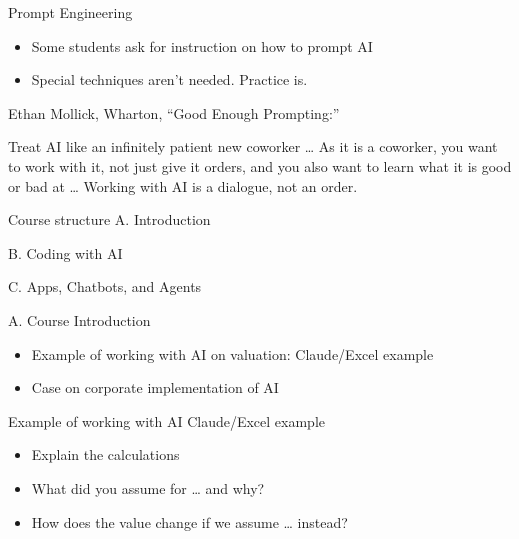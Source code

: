 \documentclass[
  ignorenonframetext,
]{beamer}
\providecommand{\tightlist}{%
  \setlength{\itemsep}{0pt}\setlength{\parskip}{0pt}}
\begin{document}
\begin{frame}{Prompt Engineering}
\label{prompt-engineering}
\begin{itemize}
\tightlist
\item
  Some students ask for instruction on how to prompt AI
\item
  Special techniques aren't needed. Practice is.
\end{itemize}

Ethan Mollick, Wharton, ``Good Enough Prompting:''

Treat AI like an infinitely patient new coworker \ldots{} As it is a
coworker, you want to work with it, not just give it orders, and you
also want to learn what it is good or bad at \ldots{} Working with AI is
a dialogue, not an order.
\end{frame}

\begin{frame}{Course structure}
\label{course-structure}
A. Introduction

B. Coding with AI

C. Apps, Chatbots, and Agents
\end{frame}

\begin{frame}{A. Course Introduction}
\label{a.-course-introduction}
\begin{itemize}
\tightlist
\item
  Example of working with AI on valuation: Claude/Excel example
\item
  Case on corporate implementation of AI
\end{itemize}
\end{frame}

\begin{frame}{Example of working with AI}
\label{example-of-working-with-ai}
Claude/Excel example

\begin{itemize}
\tightlist
\item
  Explain the calculations
\item
  What did you assume for \ldots{} and why?
\item
  How does the value change if we assume \ldots{} instead?
\end{itemize}
\end{frame}
\end{document}
